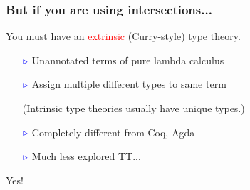 \documentclass[11pt]{beamer}
\newcommand{\myb}[0]{\ensuremath{\textcolor{blue}{\triangleright}}}
\begin{document}
\begin{frame}
  \frametitle{But if you are using intersections...}

  \pause

  You must have an \textcolor{red}{extrinsic} (Curry-style) type theory.

  \vspace{.25cm}

  \begin{itemize}
\pause
  \item[$\myb$] Unannotated terms of pure lambda calculus
\pause
  \item[$\myb$] Assign multiple different types to same term

 (Intrinsic type theories usually have unique types.)

\pause
  \item[$\myb$] Completely different from Coq, Agda
\pause
  \item[$\myb$] Much less explored TT...
  \end{itemize}
  

  \pause

\vspace{1cm}

  {\Large \color{red} Yes!}
\end{frame}
  
\end{document}

